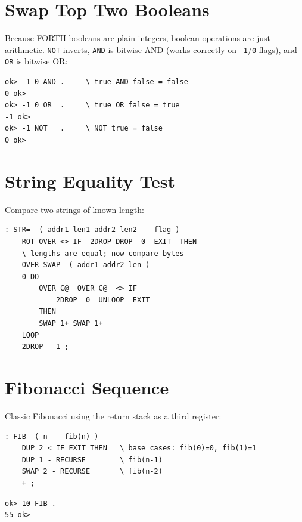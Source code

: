 \section{Swap Top Two Booleans}
\label{sec:idiom-bool-logic}

Because FORTH booleans are plain integers, boolean operations are just
arithmetic. \texttt{NOT} inverts, \texttt{AND} is bitwise AND (works correctly
on \texttt{-1}/\texttt{0} flags), and \texttt{OR} is bitwise OR:

\begin{lstlisting}[language=Forth]
ok> -1 0 AND .     \ true AND false = false
0 ok>
ok> -1 0 OR  .     \ true OR false = true
-1 ok>
ok> -1 NOT   .     \ NOT true = false
0 ok>
\end{lstlisting}

\section{String Equality Test}
\label{sec:idiom-str-eq}

Compare two strings of known length:

\begin{lstlisting}[language=Forth]
: STR=  ( addr1 len1 addr2 len2 -- flag )
    ROT OVER <> IF  2DROP DROP  0  EXIT  THEN
    \ lengths are equal; now compare bytes
    OVER SWAP  ( addr1 addr2 len )
    0 DO
        OVER C@  OVER C@  <> IF
            2DROP  0  UNLOOP  EXIT
        THEN
        SWAP 1+ SWAP 1+
    LOOP
    2DROP  -1 ;
\end{lstlisting}

\section{Fibonacci Sequence}
\label{sec:idiom-fib}

Classic Fibonacci using the return stack as a third register:

\begin{lstlisting}[language=Forth]
: FIB  ( n -- fib(n) )
    DUP 2 < IF EXIT THEN   \ base cases: fib(0)=0, fib(1)=1
    DUP 1 - RECURSE        \ fib(n-1)
    SWAP 2 - RECURSE       \ fib(n-2)
    + ;
\end{lstlisting}

\begin{lstlisting}[language=Forth]
ok> 10 FIB .
55 ok>
\end{lstlisting}

